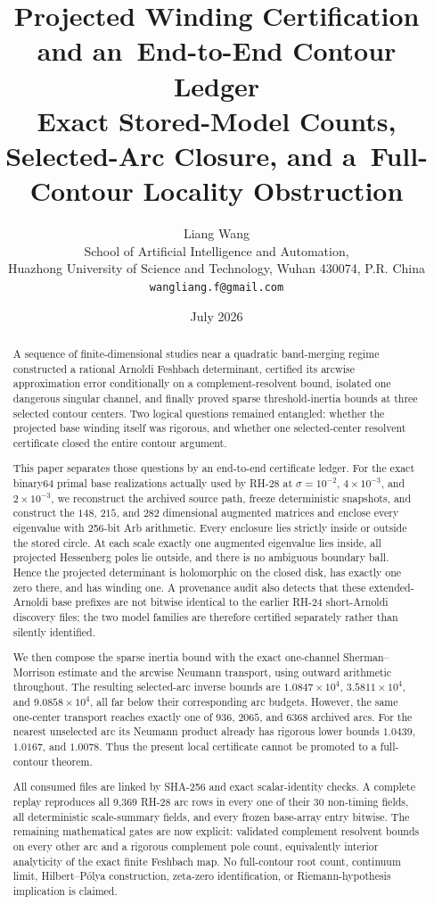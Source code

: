 \documentclass[11pt]{article}
\title{\textbf{Projected Winding Certification and an\
End-to-End Contour Ledger}\\[0.35em]
\large Exact Stored-Model Counts, Selected-Arc Closure, and a\
Full-Contour Locality Obstruction}
\author{Liang Wang\\
\small School of Artificial Intelligence and Automation,\\[-0.2em]
\small Huazhong University of Science and Technology, Wuhan 430074, P.R. China\\
\small \texttt{wangliang.f@gmail.com}}
\date{July 2026}
\theoremstyle{definition}
\theoremstyle{remark}
\begin{document}
\maketitle

\begin{abstract}
A sequence of finite-dimensional studies near a quadratic band-merging
regime constructed a rational Arnoldi Feshbach determinant, certified its
arcwise approximation error conditionally on a complement-resolvent bound,
isolated one dangerous singular channel, and finally proved sparse
threshold-inertia bounds at three selected contour centers.  Two logical
questions remained entangled: whether the projected base winding itself was
rigorous, and whether one selected-center resolvent certificate closed the
entire contour argument.

This paper separates those questions by an end-to-end certificate ledger.
For the exact binary64 primal base realizations actually used by RH-28 at
$\sigma=10^{-2}$, $4\times10^{-3}$, and $2\times10^{-3}$, we reconstruct
the archived source path, freeze deterministic snapshots, and construct the
$148$, $215$, and $282$ dimensional augmented matrices and enclose every
eigenvalue with 256-bit Arb arithmetic.  Every enclosure lies strictly
inside or outside the stored circle.  At each scale exactly one augmented
eigenvalue lies inside, all projected Hessenberg poles lie outside, and
there is no ambiguous boundary ball.  Hence the projected determinant is
holomorphic on the closed disk, has exactly one zero there, and has winding
one.  A provenance audit also detects that these extended-Arnoldi base
prefixes are not bitwise identical to the earlier RH-24 short-Arnoldi
discovery files; the two model families are therefore certified separately
rather than silently identified.

We then compose the sparse inertia bound with the exact one-channel
Sherman--Morrison estimate and the arcwise Neumann transport, using outward
arithmetic throughout.  The resulting selected-arc inverse bounds are
$1.0847\times10^4$, $3.5811\times10^4$, and $9.0858\times10^4$, all far
below their corresponding arc budgets.  However, the same one-center
transport reaches exactly one of $936$, $2065$, and $6368$ archived arcs.
For the nearest unselected arc its Neumann product already has rigorous
lower bounds $1.0439$, $1.0167$, and $1.0078$.  Thus the present local
certificate cannot be promoted to a full-contour theorem.

All consumed files are linked by SHA-256 and exact scalar-identity checks.
A complete replay reproduces all 9,369 RH-28 arc rows in every one of their
30 non-timing fields, all deterministic scale-summary fields, and every
frozen base-array entry bitwise.
The remaining mathematical gates are now explicit: validated complement
resolvent bounds on every other arc and a rigorous complement pole count,
equivalently interior analyticity of the exact finite Feshbach map.  No
full-contour root count, continuum limit, Hilbert--P\'olya construction,
zeta-zero identification, or Riemann-hypothesis implication is claimed.
\end{abstract}
\end{document}
